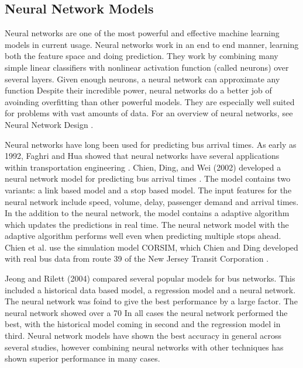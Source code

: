 \subsection{Neural Network Models}

Neural networks are one of the most powerful and effective machine learning models in current usage.
Neural networks work in an end to end manner, learning both the feature space and doing prediction.
They work by combining many simple linear classifiers with nonlinear activation function (called neurons) over several layers.
Given enough neurons, a neural network can approximate any function \cite{hornik1989multilayer}
Despite their incredible power, neural networks do a better job of avoinding overfitting than other powerful models.
They are especially well suited for problems with vast amounts of data.
For an overview of neural networks, see Neural Network Design \cite{demuth2014neural}.


Neural networks have long been used for predicting bus arrival times.
As early as 1992, Faghri and Hua showed that neural networks have several applications within transportation engineering \cite{faghri1992evaluation}.
Chien, Ding, and Wei (2002) developed a neural network model for predicting bus arrival times \cite{chien2002dynamic}.
The model contains two variants: a link based model and a stop based model.
The input features for the neural network include speed, volume, delay, passenger demand and arrival times.
In the addition to the neural network, the model contains a adaptive algorithm which updates the predictions in real time.
The neural network model with the adaptive algorithm performs well even when predicting multiple stops ahead.
Chien et al. use the simulation model CORSIM, which Chien and Ding developed with real bus data from route 39 of the New Jersey Transit Corporation \cite{ding2000simulating}.


Jeong and Rilett (2004) compared several popular models for bus networks\cite{jeong2004bus}.
This included a historical data based model, a regression model and a neural network.
The neural network was foind to give the best performance by a large factor.
The neural network showed over a 70%
In all cases the neural network performed the best, with the historical model coming in second and the regression model in third.
Neural network models have shown the best accuracy in general across several studies, however combining neural networks with other techniques has shown superior performance in many cases.

